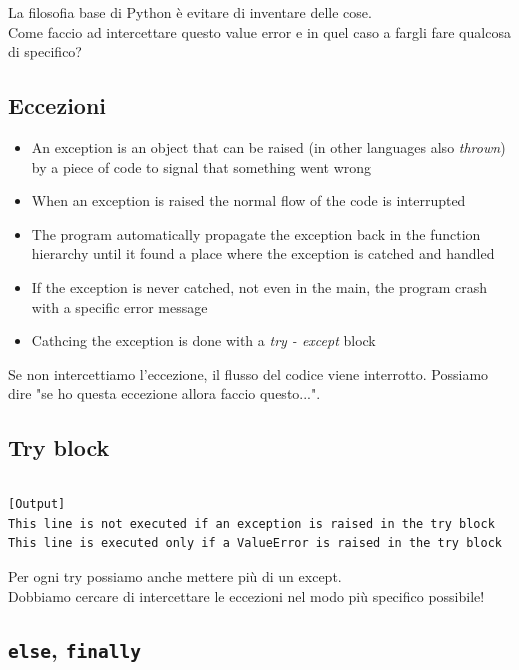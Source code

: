 La filosofia base di Python è evitare di inventare delle cose.\\
Come faccio ad intercettare questo value error e in quel caso a fargli fare qualcosa di specifico?\\

\subsection{Eccezioni}

  \begin{itemize}
    \item An exception is an object that can be \alert{raised} (in other languages also \textit{thrown}) by
          a piece of code to signal that something went wrong
    \item When an exception is raised the normal flow of the code is interrupted
    \item The program automatically propagate the exception back in the function hierarchy
          until it found a place where the exception is  \alert{catched} and handled
    \item If the exception is never catched, not even in the main, the program crash \alert{with a specific error message}
    \item Cathcing the exception is done with a \emph{try - except} block
  \end{itemize}
  
Se non intercettiamo l'eccezione, il flusso del codice viene interrotto.
Possiamo dire "se ho questa eccezione allora faccio questo...".

\subsection{Try block}


\inputminted{python}{snippets/exceptions_brief.py}
\begin{verbatim}
[Output]
This line is not executed if an exception is raised in the try block
This line is executed only if a ValueError is raised in the try block
\end{verbatim}

Per ogni try possiamo anche mettere più di un except.\\
Dobbiamo cercare di intercettare le eccezioni nel modo più specifico possibile!

\subsection{\texttt{else}, \texttt{finally}}

